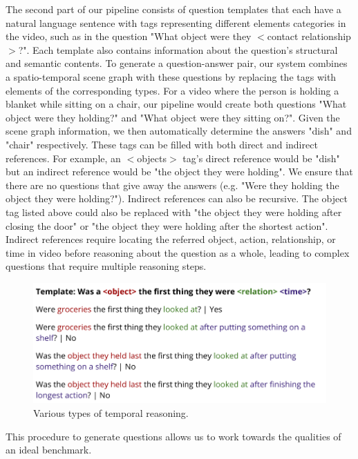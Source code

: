 \documentclass[10pt,twocolumn,letterpaper]{article}
\begin{document}
The second part of our pipeline consists of question templates that each have a natural language sentence with tags representing different elements categories in the video, such as in the question "What object were they $<$contact relationship$>$?". Each template also contains information about the question's structural and semantic contents. To generate a question-answer pair, our system combines a spatio-temporal scene graph with these questions by replacing the tags with elements of the corresponding types. For a video where the person is holding a blanket while sitting on a chair, our pipeline would create both questions "What object were they holding?" and "What object were they sitting on?". Given the scene graph information, we then automatically determine the answers "dish" and "chair" respectively. These tags can be filled with both direct and indirect references. For example, an $<$objects$>$ tag's direct reference would be "dish" but an indirect reference would be "the object they were holding". We ensure that there are no questions that give away the answers (e.g. "Were they holding the object they were holding?"). Indirect references can also be recursive. The object tag listed above could also be replaced with "the object they were holding after closing the door" or "the object they were holding after the shortest action". Indirect references require locating the referred object, action, relationship, or time in video before reasoning about the question as a whole, leading to complex questions that require multiple reasoning steps. 

\begin{figure}[t]
\begin{center}
\includegraphics[width=0.8\linewidth]{figure_indirect.png}
\end{center}
   \caption{Various types of temporal reasoning.}
\label{fig:long}
\label{fig:onecol}
\end{figure}



This procedure to generate questions allows us to work towards the qualities of an ideal benchmark.
    
\end{document}
